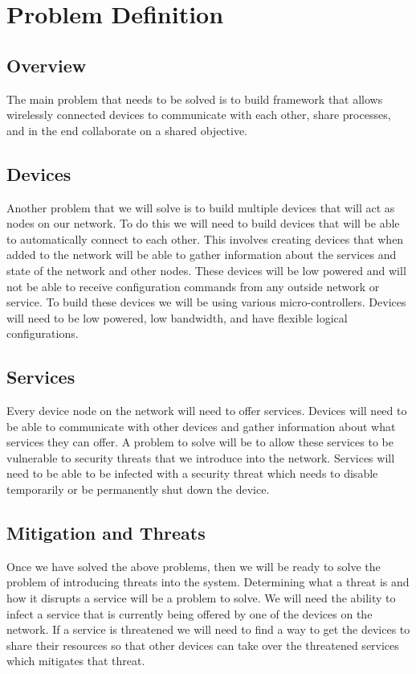 \documentclass[onecolumn, draftclsnofoot,10pt, compsoc]{IEEEtran}
\begin{document}
\newpage
{}
\tableofcontents
\newpage

\section{Problem Definition}
\subsection{Overview}
The main problem that needs to be solved is to build framework that allows wirelessly connected devices to communicate with each other, share processes, and in the end collaborate on a shared objective.
\subsection{Devices}
Another problem that we will solve is to build multiple devices that will act as nodes on our network. To do this we will need to build devices that will be able to automatically connect to each other. This involves creating devices that when added to the network will be able to gather information about the services and state of the network and other nodes. These devices will be low powered and will not be able to receive configuration commands from any outside network or service. To build these devices we will be using various micro-controllers. Devices will need to be low powered, low bandwidth, and have flexible logical configurations.
\subsection{Services}
Every device node on the network will need to offer services. Devices will need to be able to communicate with other devices and gather information about what services they can offer. A problem to solve will be to allow these services to be vulnerable to security threats that we introduce into the network. Services will need to be able to be infected with a security threat which needs to disable temporarily or be permanently shut down the device. 
\subsection{Mitigation and Threats}
Once we have solved the above problems, then we will be ready to solve the problem of introducing threats into the system. Determining what a threat is and how it disrupts a service will be a problem to solve. We will need the ability to infect a service that is currently being offered by one of the devices on the network. If a service is threatened we will need to find a way to get the devices to share their resources so that other devices can take over the threatened services which mitigates that threat.  
\end{document}
